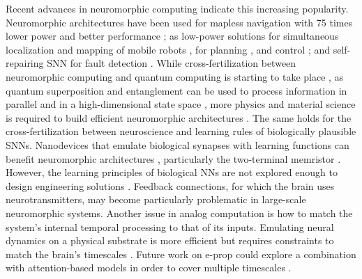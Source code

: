    Recent advances in neuromorphic computing indicate this increasing popularity.
    Neuromorphic architectures have been used for mapless navigation with 75 times lower power and better performance \citep{tang2020reinforcement}; as low-power solutions for simultaneous localization and mapping of mobile robots \citep{tang2019spiking}, for planning \citep{fischl2017path}, and control \citep{blum2017neuromorphic}; and self-repairing SNN for fault detection \citep{zhu2017target}.
    While cross-fertilization between neuromorphic computing and quantum computing is starting to take place \citep{russek2016stochastic}, as quantum superposition and entanglement can be used to process information in parallel and in a high-dimensional state space \citep{fujii2017harnessing, yamamoto2017coherent,tacchino2019artificial}, more physics and material science is required to build efficient neuromorphic architectures \citep{markovic2020physics}.
    The same holds for the cross-fertilization between neuroscience and learning rules of biologically plausible SNNs.
    Nanodevices that emulate biological synapses with learning functions can benefit neuromorphic architectures \citep{yao2017face,wang2018photonic,ren2018analytical}, particularly the two-terminal memristor \citep{jo2010nanoscale,wang2017memristors}.
    However, the learning principles of biological NNs are not explored enough to design engineering solutions \citep{gorban2019unreasonable,taherkhani2018supervised}.
    Feedback connections, for which the brain uses neurotransmitters, may become particularly problematic in large-scale neuromorphic systems.
    Another issue in analog computation is how to match the system's internal temporal processing to that of its inputs.
    Emulating neural dynamics on a physical substrate is more efficient but requires constraints to match the brain's timescales \citep{mead1990neuromorphic}.
    Future work on e-prop could explore a combination with attention-based models in order to cover multiple timescales \citep{bellec2020solution}.
